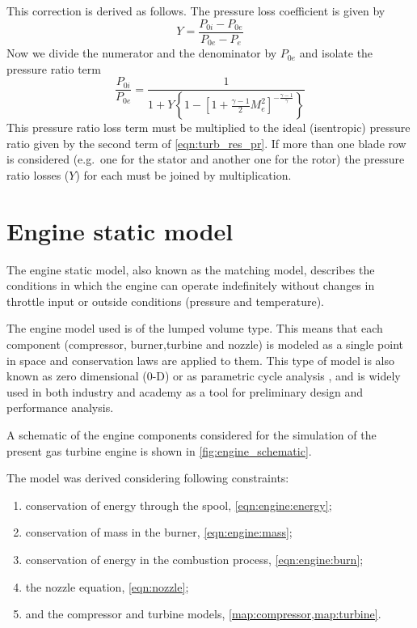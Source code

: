 \documentclass[tcc]{subfiles}
\begin{document}
This correction is derived as follows. The pressure loss coefficient is given by
\begin{equation}
    Y = \frac{P_{0i} - P_{0e}}{P_{0e} - P_e}
\end{equation}
Now we divide the numerator and the denominator by $P_{0e}$ and isolate the pressure ratio term 
\begin{equation}
    \frac{P_{0i}}{P_{0e}} = \frac{1}{1+Y\left\{1-\left[1+\tfrac{\gamma-1}{2}M_e^2\right]^{-\frac{\gamma-1}{\gamma}}\right\}}
\end{equation}
This pressure ratio loss term must be multiplied to the ideal (isentropic) pressure ratio given by the second term of \cref{eqn:turb_res_pr}. If more than one blade row is considered (e.g.\ one for the stator and another one for the rotor) the pressure ratio losses ($Y$) for each must be joined by multiplication.




\section{Engine static model}
\label{sec:model:static}

The engine static model, also known as the matching model, 
describes the conditions in which the engine can operate indefinitely 
without changes in throttle input or outside conditions (pressure and temperature).

The engine model used is of the lumped volume type. This means that each component 
 (compressor, burner,turbine and nozzle)
 is modeled as a single point in space and conservation laws are applied to them.
 This type of model is also known as zero dimensional (0-D) or as parametric cycle analysis
 ,
 and is widely used in both industry and academy as a tool for preliminary design and 
 performance analysis. 

A schematic of the engine components considered for the simulation of the present gas turbine engine is shown in \cref{fig:engine_schematic}.

The model was derived considering following constraints:

\begin{enumerate}
    \item conservation of energy through the spool, \cref{eqn:engine:energy};
    \item conservation of mass in the burner, \cref{eqn:engine:mass};
    \item conservation of energy in the combustion process, \cref{eqn:engine:burn};
    \item the nozzle equation, \cref{eqn:nozzle};
    \item and the compressor and turbine models, \cref{map:compressor,map:turbine}.
\end{enumerate}
\end{document}
